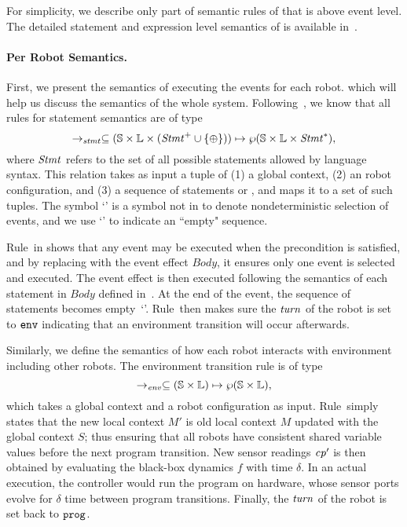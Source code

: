 For simplicity, we describe only part of semantic rules of \lgname that is above event level.
The detailed statement and expression level semantics of \lgname is available in~\cite{}.

\paragraph{Per Robot Semantics.}
First, we present the semantics of executing the events for each robot.
which will help us discuss the semantics of the whole system.
Following~\cite{}, we know that all rules for statement semantics are of type
\[
\rightarrow_\mathit{stmt} \subseteq (\mathbb{S} \times \mathbb{L}\times (\mathit{Stmt}^+ \cup \{\mathtt{\oplus}\})) \mapsto \wp(\mathbb{S}\times \mathbb{L} \times \mathit{Stmt}^*),
\]
where $\mathit{Stmt}$ refers to the set of all possible statements allowed by language syntax.
This relation takes as input a tuple of (1) a global context, (2) an robot configuration, and (3) a sequence of statements or \SelectEvent,
and maps it to a set of such tuples.
The symbol `\SelectEvent' is a symbol not in \lgname to denote nondeterministic selection of events,
and we use `\EndEvent' to indicate an ``empty" sequence.

Rule~\SelectEventRule in  shows that any event may be executed when the precondition is satisfied,
and by replacing \SelectEvent with the event effect $\mathit{Body}$, it ensures only one event is selected and executed.
The event effect is then executed following the semantics of each statement in $\mathit{Body}$ defined in~\cite{}.
At the end of the event, the sequence of statements becomes empty~`\EndEvent'.
Rule~\EndEventRule then makes sure the $\mathit{turn}$ of the robot is set to $\mathtt{env}$ indicating that
an environment transition will occur afterwards.

Similarly, we define the semantics of how each robot interacts with environment including other robots.
The environment transition rule is of type
\[
\rightarrow_\mathit{env} \subseteq (\mathbb{S} \times \mathbb{L}) \mapsto \wp(\mathbb{S}\times \mathbb{L}),
\]
which takes a global context and a robot configuration as input.
Rule~\RobotEnvTransRule simply states that the new local context $M'$ is
old local context $M$ updated with the global context $S$;
thus ensuring that all robots have consistent shared variable values before the next program transition.
New sensor readings $\mathit{cp}'$ is then obtained by evaluating the black-box dynamics $f$ with time $\delta$.
In an actual execution, the controller would run the program on hardware,
whose sensor ports evolve for $\delta$ time between program transitions.
%
Finally, the $\mathit{turn}$ of the robot is set back to $\mathtt{prog}$.


